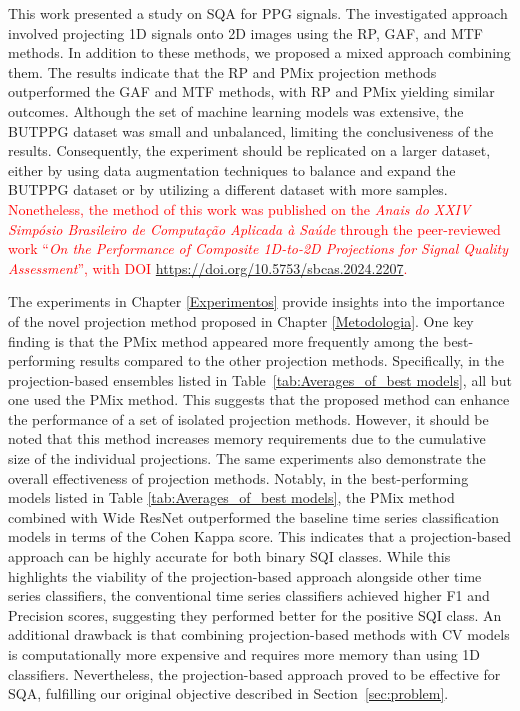This work presented a study on \gls{SQA} for \gls{PPG} signals. The investigated approach involved projecting {1D} signals onto {2D} images using the \acrshort{RP}, \acrshort{GAF}, and \acrshort{MTF} methods. In addition to these methods, we proposed a mixed approach combining them. The results indicate that the \acrshort{RP} and \gls{PMix} projection methods outperformed the \acrshort{GAF} and \acrshort{MTF} methods, with \acrshort{RP} and \gls{PMix} yielding similar outcomes. Although the set of machine learning models was extensive, the \gls{BUTPPG} dataset was small and unbalanced, limiting the conclusiveness of the results. Consequently, the experiment should be replicated on a larger dataset, either by using data augmentation techniques to balance and expand the BUTPPG dataset or by utilizing a different dataset with more samples. \textcolor{red}{Nonetheless, the method of this work was published on the \textit{Anais do XXIV Simpósio Brasileiro de Computação Aplicada à Saúde} through the peer-reviewed work ``\textit{On the Performance of Composite 1D-to-2D Projections for Signal Quality Assessment}'', with DOI \url{https://doi.org/10.5753/sbcas.2024.2207}.}


The experiments in Chapter \ref{Experimentos} provide insights into the importance of the novel projection method proposed in Chapter \ref{Metodologia}. One key finding is that the \gls{PMix} method appeared more frequently among the best-performing results compared to the other projection methods. Specifically, in the projection-based ensembles listed in Table~\ref{tab:Averages_of_best models}, all but one used the \gls{PMix} method. This suggests that the proposed method can enhance the performance of a set of isolated projection methods. However, it should be noted that this method increases memory requirements due to the cumulative size of the individual projections. The same experiments also demonstrate the overall effectiveness of projection methods. Notably, in the best-performing models listed in Table \ref{tab:Averages_of_best models}, the \gls{PMix} method combined with Wide ResNet outperformed the baseline time series classification models in terms of the Cohen Kappa score. This indicates that a projection-based approach can be highly accurate for both binary \gls{SQI} classes. While this highlights the viability of the projection-based approach alongside other time series classifiers, the conventional time series classifiers achieved higher F1 and Precision scores, suggesting they performed better for the positive \gls{SQI} class. An additional drawback is that combining projection-based methods with \gls{CV} models is computationally more expensive and requires more memory than using 1D classifiers. Nevertheless, the projection-based approach proved to be effective for \gls{SQA}, fulfilling our original objective described in Section~\ref{sec:problem}.


